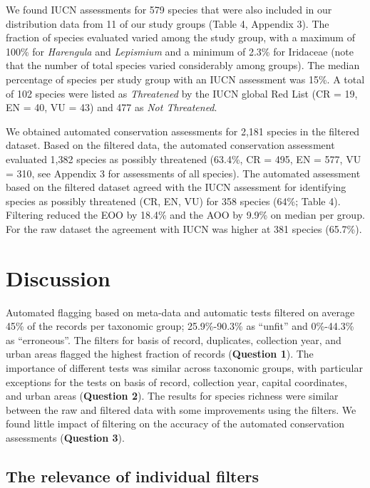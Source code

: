 \documentclass[fleqn,10pt,lineno]{wlpeerj} %
\begin{document}
We found IUCN assessments for 579 species that were also included in our distribution data from 11 of our study groups (Table 4, Appendix 3). The fraction of species evaluated varied among the study group, with a maximum of 100\% for \emph{Harengula} and \emph{Lepismium} and a minimum of 2.3\% for Iridaceae (note that the number of total species varied considerably among groups). The median percentage of species per study group with an IUCN assessment was 15\%. A total of 102 species were listed as \emph{Threatened} by the IUCN global Red List (CR = 19, EN = 40, VU = 43) and 477 as \emph{Not Threatened}.

We obtained automated conservation assessments for 2,181 species in the filtered dataset. Based on the filtered data, the automated conservation assessment evaluated 1,382 species as possibly threatened (63.4\%, CR = 495, EN = 577, VU = 310, see Appendix 3 for assessments of all species). The automated assessment based on the filtered dataset agreed with the IUCN assessment for identifying species as possibly threatened (CR, EN, VU) for 358 species (64\%; Table 4). Filtering reduced the EOO by 18.4\% and the AOO by 9.9\% on median per group. For the raw dataset the agreement with IUCN was higher at 381 species (65.7\%).

\hypertarget{discussion}{%
\section*{Discussion}\label{discussion}}

Automated flagging based on meta-data and automatic tests filtered on average 45\% of the records per taxonomic group; 25.9\%-90.3\% as ``unfit'' and 0\%-44.3\% as ``erroneous''. The filters for basis of record, duplicates, collection year, and urban areas flagged the highest fraction of records (\textbf{Question 1}). The importance of different tests was similar across taxonomic groups, with particular exceptions for the tests on basis of record, collection year, capital coordinates, and urban areas (\textbf{Question 2}). The results for species richness were similar between the raw and filtered data with some improvements using the filters. We found little impact of filtering on the accuracy of the automated conservation assessments (\textbf{Question 3}).

\hypertarget{the-relevance-of-individual-filters}{%
\subsection*{The relevance of individual filters}\label{the-relevance-of-individual-filters}}
\end{document}
